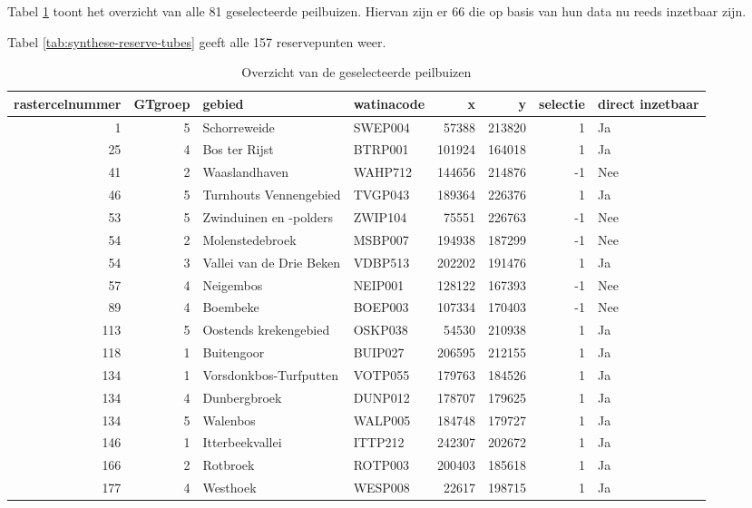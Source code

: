 \documentclass[11pt,]{book}
\begin{document}
Tabel \ref{tab:synthese-selection-tubes} toont het overzicht van alle 81
geselecteerde peilbuizen. Hiervan zijn er 66 die op basis van hun data
nu reeds inzetbaar zijn.

Tabel \ref{tab:synthese-reserve-tubes} geeft alle 157 reservepunten
weer.

\begin{table}

\caption{\label{tab:synthese-selection-tubes}Overzicht van de geselecteerde peilbuizen}
\centering
\begin{tabular}[t]{r|r|l|l|r|r|r|l}
\hline
rastercelnummer & GTgroep & gebied & watinacode & x & y & selectie & direct inzetbaar\\
\hline
1 & 5 & Schorreweide & SWEP004 & 57388 & 213820 & 1 & Ja\\
\hline
25 & 4 & Bos ter Rijst & BTRP001 & 101924 & 164018 & 1 & Ja\\
\hline
41 & 2 & Waaslandhaven & WAHP712 & 144656 & 214876 & -1 & Nee\\
\hline
46 & 5 & Turnhouts Vennengebied & TVGP043 & 189364 & 226376 & 1 & Ja\\
\hline
53 & 5 & Zwinduinen en -polders & ZWIP104 & 75551 & 226763 & -1 & Nee\\
\hline
54 & 2 & Molenstedebroek & MSBP007 & 194938 & 187299 & -1 & Nee\\
\hline
54 & 3 & Vallei van de Drie Beken & VDBP513 & 202202 & 191476 & 1 & Ja\\
\hline
57 & 4 & Neigembos & NEIP001 & 128122 & 167393 & -1 & Nee\\
\hline
89 & 4 & Boembeke & BOEP003 & 107334 & 170403 & -1 & Nee\\
\hline
113 & 5 & Oostends krekengebied & OSKP038 & 54530 & 210938 & 1 & Ja\\
\hline
118 & 1 & Buitengoor & BUIP027 & 206595 & 212155 & 1 & Ja\\
\hline
134 & 1 & Vorsdonkbos-Turfputten & VOTP055 & 179763 & 184526 & 1 & Ja\\
\hline
134 & 4 & Dunbergbroek & DUNP012 & 178707 & 179625 & 1 & Ja\\
\hline
134 & 5 & Walenbos & WALP005 & 184748 & 179727 & 1 & Ja\\
\hline
146 & 1 & Itterbeekvallei & ITTP212 & 242307 & 202672 & 1 & Ja\\
\hline
166 & 2 & Rotbroek & ROTP003 & 200403 & 185618 & 1 & Ja\\
\hline
177 & 4 & Westhoek & WESP008 & 22617 & 198715 & 1 & Ja\\

\end{tabular}
\end{table}
\end{document}
